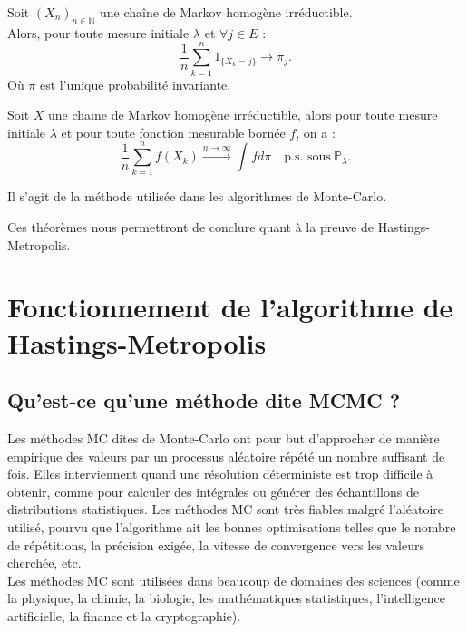 \documentclass{article}
\begin{document}
\begin{tcolorbox}[colback=white,colframe=red!80!black,title=Valeur de convergence]
Soit $(X_n)_{n \in \mathbb{N}}$ une chaîne de Markov homogène irréductible. \\

Alors, pour toute mesure initiale $\lambda$ et $\forall j \in E$ :
\[
\frac{1}{n} \sum_{k=1}^{n} 1_{\{X_k = j\}} \rightarrow \pi_j.
\]
Où $\pi$ est l'unique probabilité invariante.
\end{tcolorbox}

\begin{tcolorbox}[colback=white,colframe=blue!80!black,title=Convergence des méthodes de Monte-Carlo]
Soit $X$ une chaine de Markov homogène irréductible, alors pour toute mesure initiale $\lambda$ et pour toute fonction mesurable bornée $f$, on a :
\[
\frac{1}{n} \sum_{k=1}^{n} f(X_k) \xrightarrow{n \to \infty} \int f d\pi \quad \text{p.s. sous} \ \mathbb{P}_\lambda.
\]

Il s'agit de la méthode utilisée dans les algorithmes de Monte-Carlo.
\end{tcolorbox}
  
Ces théorèmes nous permettront de conclure quant à la preuve de Hastings-Metropolis.

\newpage %
\section{Fonctionnement de l'algorithme de Hastings-Metropolis}

\subsection{Qu'est-ce qu'une méthode dite MCMC ?}

Les méthodes MC dites de Monte-Carlo ont pour but d'approcher de manière empirique des valeurs par un processus aléatoire répété un nombre suffisant de fois. Elles interviennent quand une résolution déterministe est trop difficile à obtenir, comme pour calculer des intégrales ou générer des échantillons de distributions statistiques. Les méthodes MC sont très fiables malgré l'aléatoire utilisé, pourvu que l'algorithme ait les bonnes optimisations telles que le nombre de répétitions, la précision exigée, la vitesse de convergence vers les valeurs cherchée, etc. \\
Les méthodes MC sont utilisées dans beaucoup de domaines des sciences (comme la physique, la chimie, la biologie, les mathématiques statistiques, l'intelligence artificielle, la finance et la cryptographie). \\
\end{document}
